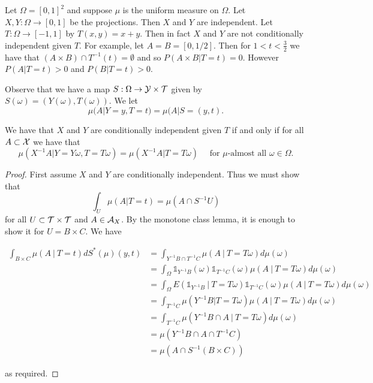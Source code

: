 \documentclass[twoside, a4paper, 10pt]{amsart}
\begin{document}
\begin{eg} Let $\Omega = [0,1]^2$ and suppose $\mu$ is the uniform measure on $\Omega$. Let $X,Y:\Omega \to [0,1]$ be the projections. Then $X$ and $Y$ are independent. Let $T:\Omega \to [-1,1]$ by $T(x,y) = x+y$. Then in fact $X$ and $Y$ are not conditionally independent given $T$. For example, let $A=B=[0,1/2]$. Then for $1< t < \frac{3}{2}$  we have that $(A \times B) \cap T^{-1}(t) = \emptyset$ and so $P(A \times B | T=t) = 0$. However $P(A|T=t)>0$ and $P(B|T=t)>0$.

Observe that we have a map $S:\Omega \to \mathcal{Y} \times \mathcal{T}$ given by $S(\omega)=(Y(\omega), T(\omega))$. We let $$\mu(A|Y=y, T=t) = \mu(A|S=(y,t).$$

\begin{lemma}\label{lemma: conditional independence iff drop conditional} We have that $X$ and $Y$ are conditionally independent given $T$ if and only if for all $A \subset \mathcal{X}$ we have that $$\mu(X^{-1}A | Y=Y\omega, T=T\omega) = \mu(X^{-1}A|T=T\omega) \quad \text{ for $\mu$-almost all } \omega \in \Omega.$$

\end{lemma}

\begin{proof} First assume $X$ and $Y$ are conditionally independent. Thus we must show that $$\int_{U}\mu(A|T=t) = \mu(A \cap S^{-1}U)$$ for all $U \subset \mathcal{T} \times \mathcal{T}$ and $A \in \mathcal{A}_X$. By the monotone class lemma, it is enough to show it for $U = B \times C$. We have 

\begin{align*} \int_{B \times C} \mu(A ~|~ T=t) dS^*(\mu)(y,t) &= \int_{Y^{-1}B \cap T^{-1}C} \mu(A ~|~ T=T\omega) d\mu(\omega) \\
&= \int_{\Omega} \mathds{1}_{Y^{-1}B}(\omega) \mathds{1}_{T^{-1}C}(\omega) \mu(A~|~ T=T\omega) d\mu(\omega) \\
&= \int_{\Omega} E(\mathds{1}_{Y^{-1}B}~|~T=T\omega) \mathds{1}_{T^{-1}C}(\omega) \mu(A ~|~ T=T\omega) d\mu(\omega) \\ 
&=  \int_{T^{-1}C} \mu(Y^{-1}B|T=T\omega) \mu(A ~|~ T=T\omega) d\mu(\omega) \\
&=  \int_{T^{-1}C} \mu(Y^{-1}B \cap A ~|~ T=T\omega)d\mu(\omega) \\
&= \mu(Y^{-1}B \cap A \cap T^{-1}C) \\
&= \mu(A \cap S^{-1}(B \times C)) \end{align*}

as required. 


\end{proof}
\end{eg}
\end{document}
